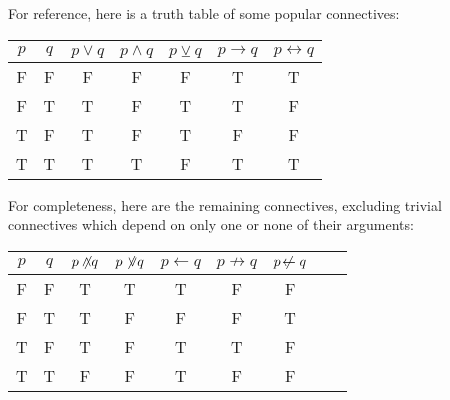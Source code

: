 \documentclass{article}
\begin{document}
For reference, here is a truth table of some popular connectives:

\begin{center}
\begin{tabular}{ccccccc}
$p$ & $q$ & $p \lor q$ & $p \land q$ & $p \veebar q$ & $p \rightarrow q$ & $p \leftrightarrow q$ \\
\hline 
F & F & F & F & F & T & T \\
F & T & T & F & T & T & F \\
T & F & T & F & T & F & F \\
T & T & T & T & F & T & T
\end{tabular}
\end{center}

For completeness, here are the remaining connectives, excluding trivial connectives which
depend on only one or none of their arguments:

\begin{center}
\begin{tabular}{ccccccccc}
$p$ & $q$ & $p \not\!\!\land q$ & $p \not\!\lor q$ & $p \leftarrow q$ & $p \not\rightarrow q$ & $p \not\!\leftarrow q$ \\
\hline 
F & F & T & T & T & F & F \\
F & T & T & F & F & F & T \\
T & F & T & F & T & T & F \\
T & T & F & F & T & F & F
\end{tabular}
\end{center}
\end{document}
